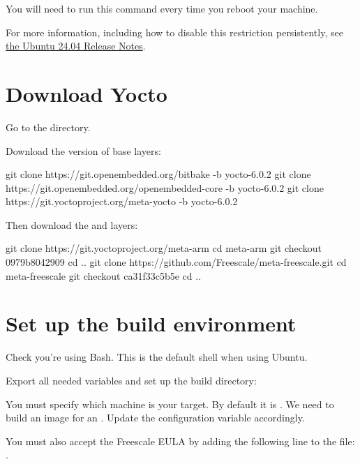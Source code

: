You will need to run this command every time you reboot your machine.

For more information, including how to disable this restriction
persistently, see
\href{https://discourse.ubuntu.com/t/ubuntu-24-04-lts-noble-numbat-release-notes/39890#p-99950-unprivileged-user-namespace-restrictions}
     {the Ubuntu 24.04 Release Notes}.

\section{Download Yocto}

Go to the  directory.

Download the  version of base layers:
\begin{bashinput}
git clone https://git.openembedded.org/bitbake -b yocto-6.0.2
git clone https://git.openembedded.org/openembedded-core -b yocto-6.0.2
git clone https://git.yoctoproject.org/meta-yocto -b yocto-6.0.2
\end{bashinput}

Then download the  and  layers:
\begin{bashinput}
git clone https://git.yoctoproject.org/meta-arm
cd meta-arm
git checkout 0979b8042909
cd ..
git clone https://github.com/Freescale/meta-freescale.git
cd meta-freescale
git checkout ca31f33c5b5e
cd ..
\end{bashinput}

\section{Set up the build environment}

Check you're using Bash. This is the default shell when using Ubuntu.

Export all needed variables and set up the build directory:

You must specify which machine is your target. By default it
is . We need to build an image for an .
Update the  configuration variable accordingly.

You must also accept the Freescale EULA by adding the following line to the
 file: .

